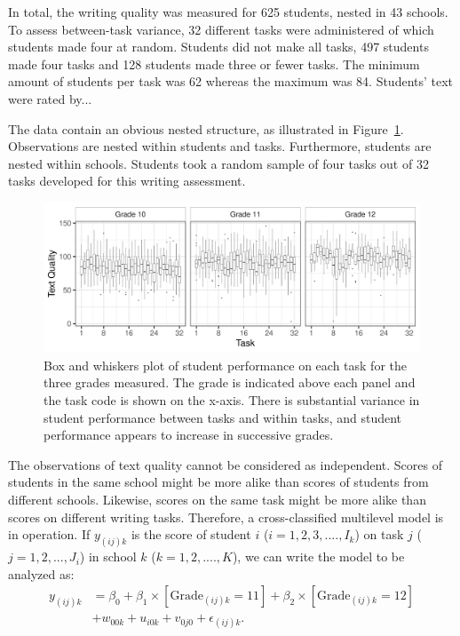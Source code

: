 \documentclass[a4paper]{article}
\newcommand{\DONa}	[1]		{\todo[inline, linecolor=gray, backgroundcolor=white]	{Don:	{#1}}}
\begin{document}
In total, the writing quality was measured for 625 students, nested in 43 schools. To assess between-task variance, 32 different tasks were administered of which students made four at random. Students did not make all tasks, 497 students made four tasks and 128 students made three or fewer tasks. The minimum amount of students per task was 62 whereas the maximum was 84. Students' text were rated by... \DONa{Aanvullen aub}

The data contain an obvious nested structure, as illustrated in Figure~\ref{fig:baselineDescriptives}. Observations are nested within students and tasks. Furthermore, students are nested within schools. Students took a random sample of four tasks out of 32 tasks developed for this writing assessment.

\begin{figure}[!ht]
	\includegraphics[width=\textwidth]{descriptivesBaseline.pdf}
	\caption{Box and whiskers plot of student performance on each task for the three grades measured. The grade is indicated above each panel and the task code is shown on the x-axis. There is substantial variance in student performance between tasks and within tasks, and student performance appears to increase in successive grades.}
	\label{fig:baselineDescriptives}
\end{figure}
The observations of text quality cannot be considered as independent.
Scores of students in the same school might be more alike than scores of students from different schools.
Likewise, scores on the same task might be more alike than scores on different writing tasks.
Therefore, a cross-classified multilevel model is in operation.
If $y_{(ij)k}$ is the score of student $i$ ($i = 1, 2, 3, ...., I_k$) on task $j$ ($j = 1, 2, ..., J_i$) in school $k$ ($k = 1, 2, ...., K$), we can write the model to be analyzed as:
\begin{align*}
	y_{(ij)k} &= \beta_0 + \beta_1 \times [\mathrm{Grade}_{(ij)k}=11] + \beta_2 \times [\mathrm{Grade}_{(ij)k}=12]\\
			  &+ w_{00k} + u_{i0k} + v_{0j0} + \epsilon_{(ij)k}.
\end{align*}
\end{document}
